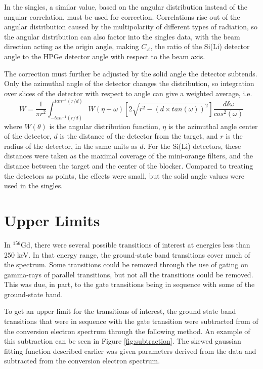 In the singles, a similar value, based on the angular distribution instead of the angular correlation, must be used for correction. Correlations rise out of the angular distribution caused by the multipolarity of different types of radiation, so the angular distribution can also factor into the singles data, with the beam direction acting as the origin angle, making $C_{\angle}$, the ratio of the Si(Li) detector angle to the HPGe detector angle with respect to the beam axis.

The correction must further be adjusted by the solid angle the detector subtends. Only the azimuthal angle of the detector changes the distribution, so integration over slices of the detector with respect to angle can give a weighted average, i.e.
\begin{equation}
    \overline{W}=\frac{1}{\pi r^2}\int^{tan^{-1}(r/d)}_{-tan^{-1}(r/d)}W(\eta+\omega)\left[2\sqrt{r^2-\left(d\times tan(\omega)\right)^2}\right]\frac{d\delta\omega}{cos^2(\omega)}
\end{equation}
where $W(\theta)$ is the angular distribution function, $\eta$ is the azimuthal angle center of the detector, $d$ is the distance of the detector from the target, and $r$ is the radius of the detector, in the same units as $d$. For the Si(Li) detectors, these distances were taken as the maximal coverage of the mini-orange filters, and the distance between the target and the center of the blocker.  Compared to treating the detectors as points, the effects were small, but the solid angle values were used in the singles.

\section{Upper Limits}
\label{sec:upper_limit}

In $^{156}$Gd, there were several possible transitions of interest at energies less than 250 keV. In that energy range, the ground-state band transitions cover much of the spectrum. Some transitions could be removed through the use of gating on gamma-rays of parallel transitions, but not all the transitions could be removed. This was due, in part, to the gate transitions being in sequence with some of the ground-state band. 

To get an upper limit for the transitions of interest, the ground state band transitions that were in sequence with the gate transition were subtracted from of the conversion electron spectrum through the following method. An example of this subtraction can be seen in Figure \ref{fig:subtraction}. The skewed gaussian fitting function described earlier was given parameters derived from the data and subtracted from the conversion electron spectrum.

